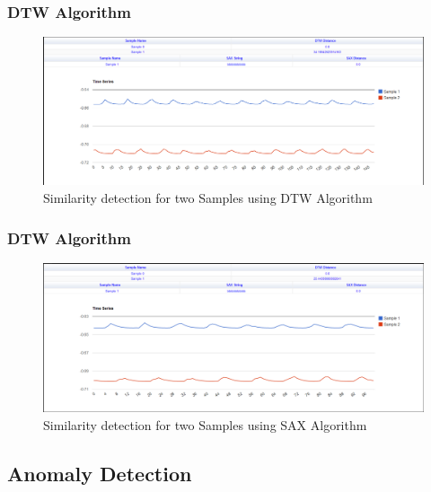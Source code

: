 \documentclass[12pt]{report}
\begin{document}
\subsubsection{DTW Algorithm }
\begin{figure}[h!]

  \centering
    \includegraphics[scale=0.35]{./screenshots/result_sim_dtw.png}
  \caption{Similarity detection for two Samples using DTW Algorithm}
\end{figure}
\subsubsection{DTW Algorithm }
\begin{figure}[h!]

  \centering
    \includegraphics[scale=0.35]{./screenshots/result_sim_sax.png}
  \caption{Similarity detection for two Samples using SAX Algorithm}
\end{figure}
\subsection{Anomaly Detection}
\end{document}
